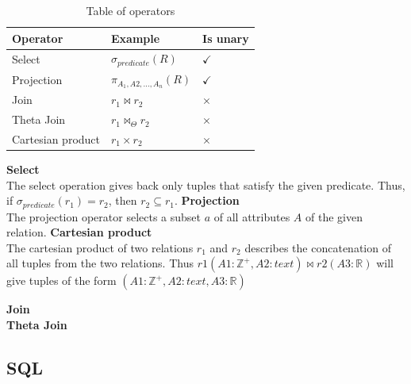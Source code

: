 \begin{table}[h]
    \centering
    \begin{tabular}{|lll|}
    \hline 
    \multicolumn{1}{|l|}{\textbf{Operator}}          & \multicolumn{1}{l|}{\textbf{Example}}   & \multicolumn{1}{l|}{\textbf{Is unary}}      \\ \hline
    \multicolumn{1}{|l|}{Select}                     & \multicolumn{1}{l|}{$\sigma_{predicate}(R)$}             & \multicolumn{1}{l|}{$\checkmark$}           \\ \hline
    \multicolumn{1}{|l|}{Projection}                 & \multicolumn{1}{l|}{$\pi_{A_1, A2,...,A_n}(R)$}             & \multicolumn{1}{l|}{$\checkmark$}           \\ \hline
    \multicolumn{1}{|l|}{Join}                       & \multicolumn{1}{l|}{$r_1 \Join r_2$}             & \multicolumn{1}{l|}{$\times$}           \\ \hline
    \multicolumn{1}{|l|}{Theta Join}                 & \multicolumn{1}{l|}{$r_1 \Join_\Theta r_2$}             & \multicolumn{1}{l|}{$\times$}           \\ \hline
    \multicolumn{1}{|l|}{Cartesian product}          & \multicolumn{1}{l|}{$r_1\times r_2$}              & \multicolumn{1}{l|}{$\times$}            \\ \hline
    \end{tabular}
    \caption{Table of operators}
    \label{Relational algebra operators}
\end{table}


\textbf{Select}\\
The select operation gives back only tuples that satisfy the given predicate. Thus, if $\sigma_{predicate}(r_1) = r_2$, then $r_2 \subseteq r_1$.
\textbf{Projection}\\
The projection operator selects a subset $a$ of all attributes $A$ of the given relation.
\textbf{Cartesian product}\\
The cartesian product of two relations $r_1$ and $r_2$ describes the concatenation of all tuples from the two relations. 
Thus $r1(A1:\mathbb{Z}^+, A2:text) \Join r2(A3:\mathbb{R})$ will give tuples of the form $(A1:\mathbb{Z}^+, A2:text,A3:\mathbb{R})$

\textbf{Join}\\
\textbf{Theta Join}\\





\subsection{SQL}\label{sec:SQL}



